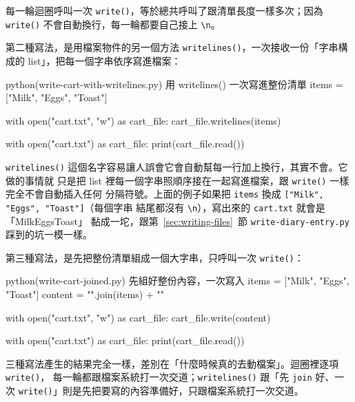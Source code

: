 每一輪迴圈呼叫一次 \texttt{write()}，等於總共呼叫了跟清單長度一樣多次；因為 \texttt{write()}
不會自動換行，每一輪都要自己接上 \texttt{\textbackslash n}。

第二種寫法，是用檔案物件的另一個方法 \texttt{writelines()}，一次接收一份「字串構成的
list」，把每一個字串依序寫進檔案：

\begin{example}{python}{(write-cart-with-writelines.py) 用 writelines() 一次寫進整份清單}
items = ["Milk\n", "Eggs\n", "Toast\n"]

with open("cart.txt", "w") as cart_file:
    cart_file.writelines(items)

with open("cart.txt") as cart_file:
    print(cart_file.read())
\end{example}


\texttt{writelines()} 這個名字容易讓人誤會它會自動幫每一行加上換行，其實不會。它做的事情就
只是把 list 裡每一個字串照順序接在一起寫進檔案，跟 \texttt{write()} 一樣完全不會自動插入任何
分隔符號。上面的例子如果把 \texttt{items} 換成 \texttt{["Milk", "Eggs", "Toast"]}（每個字串
結尾都沒有 \texttt{\textbackslash n}），寫出來的 \texttt{cart.txt} 就會是「MilkEggsToast」
黏成一坨，跟第~\ref{sec:writing-files}~節 \texttt{write-diary-entry.py} 踩到的坑一模一樣。

第三種寫法，是先把整份清單組成一個大字串，只呼叫一次 \texttt{write()}：

\begin{example}{python}{(write-cart-joined.py) 先組好整份內容，一次寫入}
items = ["Milk", "Eggs", "Toast"]
content = "\n".join(items) + "\n"

with open("cart.txt", "w") as cart_file:
    cart_file.write(content)

with open("cart.txt") as cart_file:
    print(cart_file.read())
\end{example}


三種寫法產生的結果完全一樣，差別在「什麼時候真的去動檔案」。迴圈裡逐項 \texttt{write()}，
每一輪都跟檔案系統打一次交道；\texttt{writelines()} 跟「先 \texttt{join} 好、一次
\texttt{write()}」則是先把要寫的內容準備好，只跟檔案系統打一次交道。

